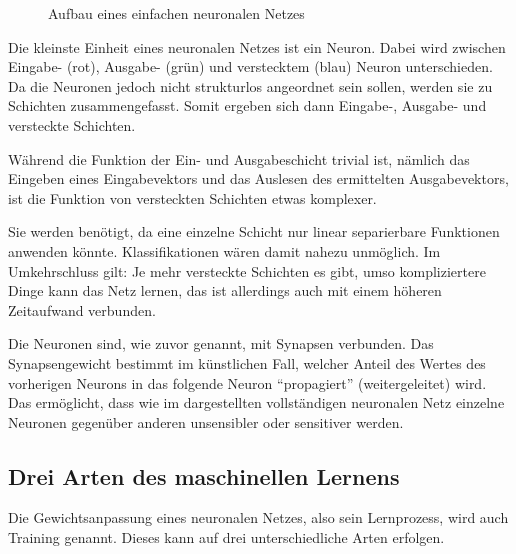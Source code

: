 \documentclass[12pt,a4]{article}
\begin{document}
\begin{figure}[!h]
\caption{Aufbau eines einfachen neuronalen Netzes}
\end{figure}
Die kleinste Einheit eines neuronalen Netzes ist ein Neuron. Dabei wird zwischen Eingabe- (rot), Ausgabe- (grün) und verstecktem (blau) Neuron unterschieden. Da die Neuronen jedoch nicht strukturlos angeordnet sein sollen, werden sie zu Schichten zusammengefasst. Somit ergeben sich dann Eingabe-, Ausgabe- und versteckte Schichten. 

Während die Funktion der Ein- und Ausgabeschicht trivial ist, nämlich das Eingeben eines Eingabevektors und das Auslesen des ermittelten Ausgabevektors, ist die Funktion von versteckten Schichten etwas komplexer.

Sie werden benötigt, da eine einzelne Schicht nur linear separierbare Funktionen anwenden könnte. Klassifikationen wären damit nahezu unmöglich. Im Umkehrschluss gilt: Je mehr versteckte Schichten es gibt, umso kompliziertere Dinge kann das Netz lernen, das ist allerdings auch mit einem höheren Zeitaufwand verbunden.

Die Neuronen sind, wie zuvor genannt, mit Synapsen verbunden. Das Synapsengewicht bestimmt im künstlichen Fall, welcher Anteil des Wertes des vorherigen Neurons in das folgende Neuron \enquote{propagiert} (weitergeleitet) wird. Das ermöglicht, dass wie im dargestellten vollständigen neuronalen Netz einzelne Neuronen gegenüber anderen unsensibler oder sensitiver werden.

\subsection{Drei Arten des maschinellen Lernens \cite{PythonMachineLearningChapter1}}
Die Gewichtsanpassung eines neuronalen Netzes, also sein Lernprozess, wird auch Training genannt. Dieses kann auf drei unterschiedliche Arten erfolgen.
\end{document}

